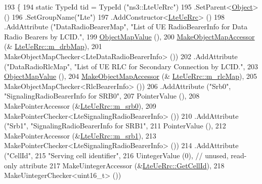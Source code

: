 \begin{DoxyCode}
193 \{
194   \textcolor{keyword}{static} TypeId tid = TypeId (\textcolor{stringliteral}{"ns3::LteUeRrc"})
195     .SetParent<\hyperlink{classns3_1_1Object_a40860402e64d8008fb42329df7097cdb}{Object}> ()
196     .SetGroupName(\textcolor{stringliteral}{"Lte"})
197     .AddConstructor<\hyperlink{classns3_1_1LteUeRrc_ac88049382e8f5b8c006f9787c724bb8c}{LteUeRrc}> ()
198     .AddAttribute (\textcolor{stringliteral}{"DataRadioBearerMap"}, \textcolor{stringliteral}{"List of UE RadioBearerInfo for Data Radio Bearers by LCID."},
199                    \hyperlink{namespacens3_a5cac680c954929d49b48f4c40c1a2e08}{ObjectMapValue} (),
200                    \hyperlink{namespacens3_acfdf708e388c66beea68eb5ecdcb7456}{MakeObjectMapAccessor} (&
      \hyperlink{classns3_1_1LteUeRrc_aa85c5bdde73c2072b2b3053e629bdce0}{LteUeRrc::m\_drbMap}),
201                    MakeObjectMapChecker<LteDataRadioBearerInfo> ())
202     .AddAttribute (\textcolor{stringliteral}{"DataRadioRlcMap"}, \textcolor{stringliteral}{"List of UE RLC for Secondary Connection by LCID."},
203                    \hyperlink{namespacens3_a5cac680c954929d49b48f4c40c1a2e08}{ObjectMapValue} (),
204                    \hyperlink{namespacens3_acfdf708e388c66beea68eb5ecdcb7456}{MakeObjectMapAccessor} (&
      \hyperlink{classns3_1_1LteUeRrc_a64b3948cda818827b8774d7a2be7ea4f}{LteUeRrc::m\_rlcMap}),
205                    MakeObjectMapChecker<RlcBearerInfo> ())
206     .AddAttribute (\textcolor{stringliteral}{"Srb0"}, \textcolor{stringliteral}{"SignalingRadioBearerInfo for SRB0"},
207                    PointerValue (),
208                    MakePointerAccessor (&\hyperlink{classns3_1_1LteUeRrc_a1ed76d4e424d770de67c3e39f516ac4d}{LteUeRrc::m\_srb0}),
209                    MakePointerChecker<LteSignalingRadioBearerInfo> ())
210     .AddAttribute (\textcolor{stringliteral}{"Srb1"}, \textcolor{stringliteral}{"SignalingRadioBearerInfo for SRB1"},
211                    PointerValue (),
212                    MakePointerAccessor (&\hyperlink{classns3_1_1LteUeRrc_aeb8ad627a3df9126d146bacb6dc3dce6}{LteUeRrc::m\_srb1}),
213                    MakePointerChecker<LteSignalingRadioBearerInfo> ())
214     .AddAttribute (\textcolor{stringliteral}{"CellId"},
215                    \textcolor{stringliteral}{"Serving cell identifier"},
216                    UintegerValue (0), \textcolor{comment}{// unused, read-only attribute}
217                    MakeUintegerAccessor (&\hyperlink{classns3_1_1LteUeRrc_a4313c830c88d4b22e5ff25d92785393a}{LteUeRrc::GetCellId}),
218                    MakeUintegerChecker<uint16\_t> ())

\end{DoxyCode}
